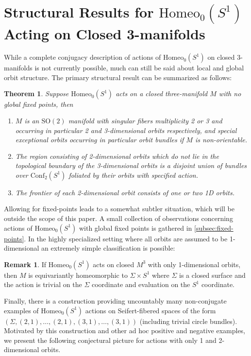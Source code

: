 \documentclass[10pt, oneside]{article}
\newcommand{\SO}[1][2]{\text{SO}(#1)}
\newcommand{\homeo}[1][S^1]{\text{Homeo}_0(#1)}
\newcommand{\conf}[2][S^1]{\text{Conf}_{#2}(#1)}
\newtheorem{thm}{Theorem}[section]
\theoremstyle{definition}
\newtheorem{rem}{Remark}[section]
\theoremstyle{definition}
\begin{document}
\section{Structural Results for \texorpdfstring{$\homeo$}{Homeo\_0(S\string^1)} Acting on Closed 3-manifolds}\label{sec:homeos1}
While a complete conjugacy description of actions of $\homeo$ on closed 3-manifolds is not currently possible, much can still be said about local and global orbit structure. The primary structural result can be summarized as follows:

\begin{thm}\label{thm:main-structure-thm}
    Suppose $\homeo$ acts on a closed three-manifold $M$ with no global fixed points, then 
    \begin{enumerate}
        \item $M$ is an $\SO$ manifold with singular fibers multiplicity 2 or 3 and occurring in particular 2 and 3-dimensional orbits respectively, and special exceptional orbits occurring in particular orbit bundles if $M$ is non-orientable.
        \item The region consisting of 2-dimensional orbits which do not lie in the topological boundary of the 3-dimensional orbits is a disjoint union of bundles over $\conf[S^1]{2}$ foliated by their orbits with specified action.
        \item The frontier of each 2-dimensional orbit consists of one or two 1D orbits.
    \end{enumerate}  
\end{thm}

Allowing for fixed-points leads to a somewhat subtler situation, which will be outside the scope of this paper. A small collection of observations concerning actions of $\homeo$ with global fixed points is gathered in \cref{subsec:fixed-points}. In the highly specialized setting where all orbits are assumed to be 1-dimensional an extremely simple classification is possible:

\begin{rem}\label{rem:only-1d-orbs}
    If $\homeo$ acts on closed $M^3$ with only 1-dimensional orbits, then $M$ is equivariantly homeomorphic to $\Sigma \times S^1$ where $\Sigma$ is a closed surface and the action is trivial on the $\Sigma$ coordinate and evaluation on the $S^1$ coordinate.
\end{rem}

Finally, there is a construction providing uncountably many non-conjugate examples of $\homeo$ actions on Seifert-fibered spaces of the form $(\Sigma, (2, 1), \dots, (2, 1), (3, 1), \dots, (3, 1))$ (including trivial circle bundles). Motivated by this construction and other ad hoc positive and negative examples, we present the following conjectural picture for actions with only 1 and 2-dimensional orbits.
\end{document}

